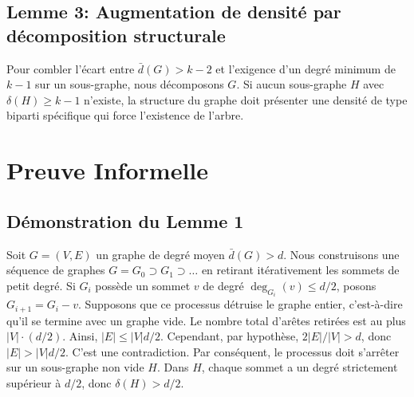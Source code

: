 \documentclass[11pt,a4paper]{article}
\begin{document}
\subsection{Lemme 3: Augmentation de densit\'e par d\'ecomposition structurale}
Pour combler l'\'ecart entre $\bar{d}(G) > k-2$ et l'exigence d'un degr\'e minimum de $k-1$ sur un sous-graphe, nous d\'ecomposons $G$. Si aucun sous-graphe $H$ avec $\delta(H) \geq k-1$ n'existe, la structure du graphe doit pr\'esenter une densit\'e de type biparti sp\'ecifique qui force l'existence de l'arbre.

\section{Preuve Informelle}

\subsection{D\'emonstration du Lemme 1}
Soit $G = (V, E)$ un graphe de degr\'e moyen $\bar{d}(G) > d$.
Nous construisons une s\'equence de graphes $G = G_0 \supset G_1 \supset \dots$ en retirant it\'erativement les sommets de petit degr\'e.
Si $G_i$ poss\`ede un sommet $v$ de degr\'e $\deg_{G_i}(v) \leq d/2$, posons $G_{i+1} = G_i - v$.
Supposons que ce processus d\'etruise le graphe entier, c'est-\`a-dire qu'il se termine avec un graphe vide.
Le nombre total d'ar\^etes retir\'ees est au plus $|V| \cdot (d/2)$.
Ainsi, $|E| \leq |V|d/2$.
Cependant, par hypoth\`ese, $2|E|/|V| > d$, donc $|E| > |V|d/2$. C'est une contradiction.
Par cons\'equent, le processus doit s'arr\^eter sur un sous-graphe non vide $H$.
Dans $H$, chaque sommet a un degr\'e strictement sup\'erieur \`a $d/2$, donc $\delta(H) > d/2$.
\end{document}
